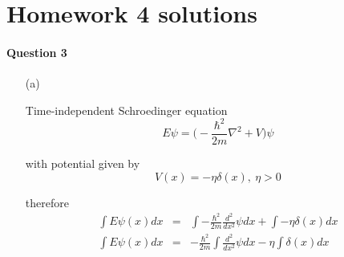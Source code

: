 \documentclass[11pt,a4paper]{article}
\author{Zehao Gao}
\begin{document}
\section*{Homework 4 solutions}

\paragraph*{Question 3}

\begin{enumerate}

\item[(a)]

    Time-independent Schroedinger equation
    \begin{equation} 
        E\psi=\bigg(-\frac{\hbar^2}{2m}\nabla^2+V\bigg)\psi
    \end{equation}

    with potential given by
    \begin{equation}
        V(x)=-\eta\delta(x),\ \eta>0
    \end{equation}

    therefore
    \begin{eqnarray} 
        \int E\psi(x)dx&=&\int -\frac{\hbar^2}{2m}\frac{d^2}{dx^2}\psi dx+\int -\eta\delta(x) dx \\
        \int E\psi(x)dx&=&-\frac{\hbar^2}{2m}\int\frac{d^2}{dx^2}\psi dx-\eta\int\delta(x) dx \\
    \end{eqnarray}

\end{enumerate}
\end{document}
